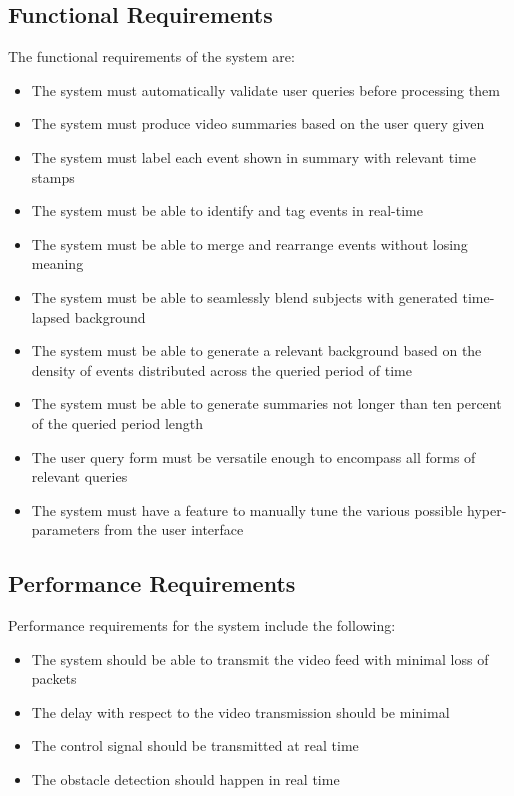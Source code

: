     \subsection{Functional Requirements}
    The functional requirements of the system are:
    \begin{itemize}
        \item The system must automatically validate user queries before
        processing them
        \item The system must produce video summaries based on the user query
        given
        \item The system must label each event shown in summary with relevant
        time stamps
        \item The system must be able to identify and tag events in real-time
        \item The system must be able to merge and rearrange events without
        losing meaning
        \item The system must be able to seamlessly blend subjects with
        generated time-lapsed background
        \item The system must be able to generate a relevant background based on
        the density of events distributed across the queried period of time
        \item The system must be able to generate summaries not longer than ten
        percent of the queried period length
        \item The user query form must be versatile enough to encompass all
        forms of relevant queries
        \item The system must have a feature to manually tune the various
        possible hyper-parameters from the user interface
    \end{itemize}

    \subsection{Performance Requirements}
    Performance requirements for the system include the following:
    \begin{itemize}
        \item The system should be able to transmit the video feed with minimal
        loss of packets
        \item The delay with respect to the video transmission should be minimal
        \item The control signal should be transmitted at real time
        \item The obstacle detection should happen in real time
    \end{itemize}

